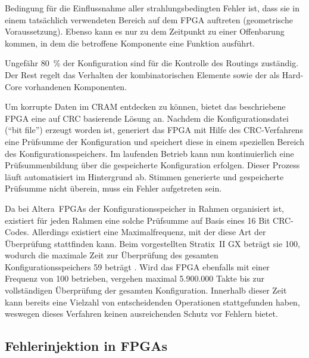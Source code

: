 Bedingung für die Einflussnahme aller strahlungsbedingten Fehler ist,
dass sie in einem tatsächlich verwendeten Bereich auf dem FPGA
auftreten (geometrische Voraussetzung). Ebenso kann es nur zu dem
Zeitpunkt zu einer Offenbarung kommen, in dem die betroffene
Komponente eine Funktion ausführt.

Ungefähr 80~\% der Konfiguration sind für die Kontrolle des Routings
zuständig. Der Rest regelt das Verhalten der kombinatorischen
Elemente sowie der als Hard-Core vorhandenen Komponenten.

Um korrupte Daten im CRAM entdecken zu können, bietet das beschriebene
FPGA eine auf CRC basierende Lösung an. Nachdem die
Konfigurationsdatei (``bit file'') erzeugt worden ist, generiert das
FPGA mit Hilfe des CRC-Verfahrens eine Prüfsumme der
Konfiguration und speichert diese in einem speziellen Bereich des
Konfigurationsspeichers. Im laufenden Betrieb kann nun kontinuierlich
eine Prüfsummenbildung über die gespeicherte Konfiguration
erfolgen. Dieser Prozess läuft automatisiert im Hintergrund
ab. Stimmen generierte und gespeicherte Prüfsumme nicht überein, muss
ein Fehler aufgetreten sein.

Da bei Altera\TReg\ FPGAs der Konfigurationsspeicher in Rahmen
organisiert ist, existiert für jeden Rahmen eine solche Prüfsumme auf
Basis eines 16 Bit CRC-Codes. Allerdings existiert eine
Maximalfrequenz, mit der diese Art der Überprüfung stattfinden
kann. Beim vorgestellten Stratix\TReg\ II GX beträgt sie
\unit{100}{\mega\hertz}, wodurch die maximale Zeit zur Überprüfung des
gesamten Konfigurationsspeichers \unit{59}{\milli\second} beträgt
\cite[S. 10]{altera_an357}. Wird das FPGA ebenfalls mit einer Frequenz
von \unit{100}{\mega\hertz} betrieben, vergehen maximal 5.900.000
Takte bis zur vollständigen Überprüfung der gesamten Konfiguration. Innerhalb dieser Zeit kann bereits eine Vielzahl von entscheidenden Operationen stattgefunden haben, weswegen dieses Verfahren keinen ausreichenden Schutz vor Fehlern bietet.


\subsection{Fehlerinjektion in FPGAs}
\label{sec:grundlagen_fpgas_fehlerinjektion}

